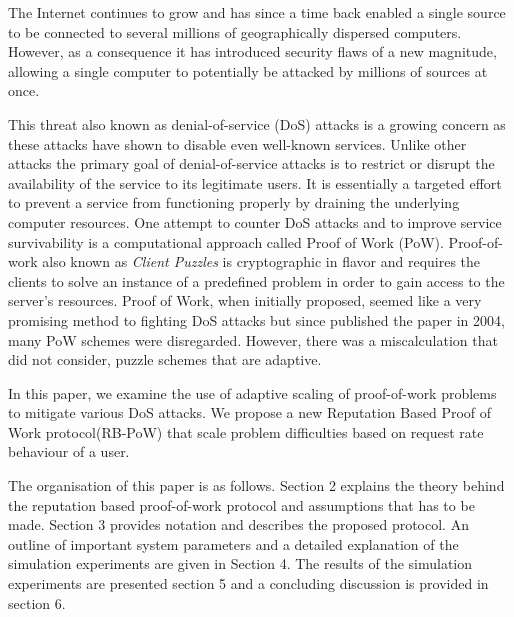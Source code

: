 The Internet continues to grow and has since a time back enabled a single source to be connected to several millions of geographically dispersed computers. However, as a consequence it has introduced security flaws of a new magnitude, allowing a single computer to potentially be attacked by millions of sources at once. 

This threat also known as denial-of-service (DoS) attacks is a growing concern as these attacks have shown to disable even well-known services. Unlike other attacks the primary goal of denial-of-service attacks is to restrict or disrupt the availability of the service to its legitimate users. It is essentially a targeted effort to prevent a service from functioning properly by draining the underlying computer resources. 
One attempt to counter DoS attacks and to improve service survivability is a computational approach called Proof of Work (PoW). Proof-of-work also known as \emph{Client Puzzles}\cite{dosauth, JuelsB99} is cryptographic in flavor and requires the clients to solve an instance of a predefined problem in order to gain access to the server’s resources. Proof of Work, when initially proposed, seemed like a very promising method to fighting DoS attacks but since \citeauthor{LaurieC04} published the paper  in 2004, many PoW schemes were disregarded. However, there was a miscalculation that \citeauthor{LaurieC04} did not consider, puzzle schemes that are adaptive\cite{Green,gunter}.

In this paper, we examine the use of adaptive scaling of proof-of-work problems to mitigate various DoS attacks. We propose a new Reputation Based Proof of Work protocol(RB-PoW) that scale problem difficulties based on request rate behaviour of a user.

The organisation of this paper is as follows. Section 2 explains the theory behind the reputation based proof-of-work protocol and assumptions that has to be made. Section 3 provides notation and describes the proposed protocol. An outline of important system parameters and a detailed explanation of the simulation experiments are given in Section 4. The results of the simulation experiments are presented section 5 and a concluding discussion is provided in section 6.




